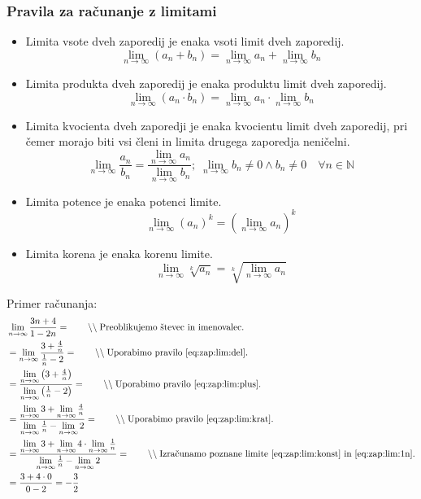 \documentclass[a4paper,oneside,12pt,fleqn]{article}
\def\N{\ensuremath{\mathbb N}}
\newcommand\krat\cdot
\newcommand{\comment}[1]{\ensuremath{\qquad\backslash\backslash\;}\textnormal{#1}}
\def\limi{\displaystyle\lim_{n\to\infty}} %
\numberwithin{equation}{section}
\begin{document}
\subsubsection{Pravila za računanje z limitami}
\label{sec:zap:lim:rac}
\begin{itemize}
  \item Limita vsote dveh zaporedij je enaka vsoti limit dveh zaporedij.
    \begin{equation}
      \limi(a_n + b_n) = \limi a_n + \limi b_n \label{eq:zap:lim:plus}
    \end{equation}
  \item Limita produkta dveh zaporedij je enaka produktu limit dveh zaporedij.
    \begin{equation}
      \limi(a_n\krat b_n) = \limi a_n \krat \limi b_n \label{eq:zap:lim:krat}
    \end{equation}
  \item Limita kvocienta dveh zaporedji je enaka kvocientu limit dveh zaporedij, pri čemer
    morajo biti vsi členi in limita drugega zaporedja neničelni.
    \begin{equation}
      \limi\frac{a_n}{b_n} = \frac{\limi a_n}{\limi b_n}; \; \limi b_n \neq 0 \land b_n
      \neq 0 \quad \forall n \in \N \label{eq:zap:lim:del}
    \end{equation}
  \item Limita potence je enaka potenci limite.
    \begin{equation}
      \limi (a_n)^k = (\limi a_n)^k \label{eq:zap:lim:pot}
    \end{equation}
  \item Limita korena je enaka korenu limite.
    \begin{equation}
      \limi \sqrt[k]{a_n} = \sqrt[k]{\limi a_n} \label{eq:zap:lim:kor}
    \end{equation}
\end{itemize}

Primer računanja:
\begin{align*}
  & \limi\frac{3n+4}{1-2n} = \comment{Preoblikujemo števec in imenovalec.} \\
  & = \limi\frac{3+\frac{4}{n}}{\frac{1}{n} - 2} = \comment{Uporabimo pravilo~\eqref{eq:zap:lim:del}.} \\
  & = \frac{\limi\left(3+\textstyle\frac{4}{n}\right)}{\limi\left(\textstyle\frac{1}{n} - 2\right)} = \comment{Uporabimo pravilo~\eqref{eq:zap:lim:plus}.} \\
  & = \frac{\limi3 + \limi\textstyle\frac{4}{n}}{\limi\textstyle\frac{1}{n} - \limi2} = \comment{Uporabimo pravilo~\eqref{eq:zap:lim:krat}.} \\
  & = \frac{\limi3 + \limi4 \krat \limi\textstyle\frac{1}{n}}{\limi\textstyle\frac{1}{n} - \limi2} =
  \comment{Izračunamo poznane limite~\eqref{eq:zap:lim:konst} in~\eqref{eq:zap:lim:1n}.} \\
  & = \frac{3 + 4 \krat 0}{0 - 2} = -\frac{3}{2}
\end{align*}
\end{document}
